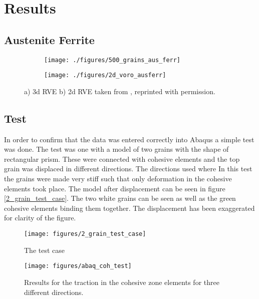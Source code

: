 \documentclass[convergence.tex]{subfiles}
\begin{document}
\chapter{Results}

\section{Austenite Ferrite}

 \begin{figure}
\centering
\begin{subfigure}{.5\textwidth}
  \centering
  \texttt{[image: ./figures/500\_grains\_aus\_ferr]}
  \caption{}
  \label{fig:ausferr_3d}
\end{subfigure}%
\begin{subfigure}{.6\textwidth}
  \centering
  \texttt{[image: ./figures/2d\_voro\_ausferr]}
  \caption{}
  \label{fig:ausferr_2d}
\end{subfigure}
\caption{a) 3d RVE  b) 2d RVE taken from \cite{lillbacka2007multiscale}, reprinted with permission.}
\label{fig:ausferr}
\end{figure}

\section{Test}

In order to confirm that the data was entered correctly into Abaqus a simple test was done. The test was one with a model of two grains with the shape of rectangular prism. These were connected with cohesive elements and the top grain was displaced in different directions. The directions used where  In this test the grains were made very stiff such that only deformation in the cohesive elements took place. The model after displacement can be seen in figure \ref{2_grain_test_case}. The two white grains can be seen as well as the green cohesive elements binding them together. The displacement has been exaggerated for clarity of the figure.

\begin{figure}[ht]
\centering
\texttt{[image: figures/2\_grain\_test\_case]}
\caption{The test case}
\label{fig:test_case}
\end{figure}


\begin{figure}[ht]
\centering
\texttt{[image: figures/abaq\_coh\_test]}
\caption{Rresults for the traction in the cohesive zone elements for three different directions.}
\label{fig:test_case}
\end{figure}
\end{document}
